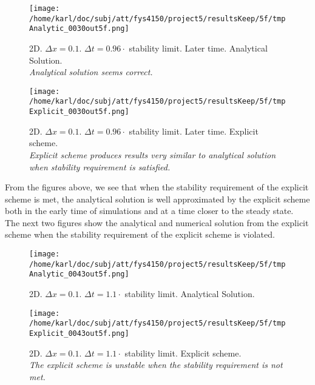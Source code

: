 \documentclass{article}
\begin{document}
\begin{minipage}{.45\textwidth} 
	\begin{figure}[H]
		\centering
		\texttt{[image: /home/karl/doc/subj/att/fys4150/project5/resultsKeep/5f/tmpAnalytic\_0030out5f.png]}
		\caption{2D. $\Delta x = 0.1$. $\Delta t = 0.96 \cdot$ stability limit. Later time. Analytical Solution.\\ \textit{Analytical solution seems correct.}}
		\label{fig:fig2d4}
	\end{figure}
\end{minipage}\hfill
\begin{minipage}{.45\textwidth} 
	\begin{figure}[H]
		\centering
		\texttt{[image: /home/karl/doc/subj/att/fys4150/project5/resultsKeep/5f/tmpExplicit\_0030out5f.png]}
		\caption{2D. $\Delta x = 0.1$. $\Delta t = 0.96 \cdot$ stability limit. Later time. Explicit scheme.\\ \textit{Explicit scheme produces results very similar to analytical solution when stability requirement is satisfied.}}
		\label{fig:fig2d5}
	\end{figure}
\end{minipage}\hfill
\vspace{2ex}

From the figures above, we see that when the stability requirement of the explicit scheme is met, the analytical solution is well approximated by the explicit scheme both in the early time of simulations and at a time closer to the steady state.\\

The next two figures show the analytical and numerical solution from the explicit scheme when the stability requirement of the explicit scheme is violated.


\begin{minipage}{.45\textwidth} 
	\begin{figure}[H]
		\centering
		\texttt{[image: /home/karl/doc/subj/att/fys4150/project5/resultsKeep/5f/tmpAnalytic\_0043out5f.png]}
		\caption{2D. $\Delta x = 0.1$. $\Delta t = 1.1 \cdot$ stability limit.  Analytical Solution.\\ \textit{}}
		\label{fig:fig2d6}
	\end{figure}
\end{minipage}\hfill
\begin{minipage}{.45\textwidth} 
	\begin{figure}[H]
		\centering
		\texttt{[image: /home/karl/doc/subj/att/fys4150/project5/resultsKeep/5f/tmpExplicit\_0043out5f.png]}
		\caption{2D. $\Delta x = 0.1$. $\Delta t = 1.1 \cdot$ stability limit.  Explicit scheme.\\ \textit{The explicit scheme is unstable when the stability requirement is not met.}}
		\label{fig:fig2d7}
	\end{figure}
\end{minipage}\hfill
\vspace{2ex}
\end{document}
